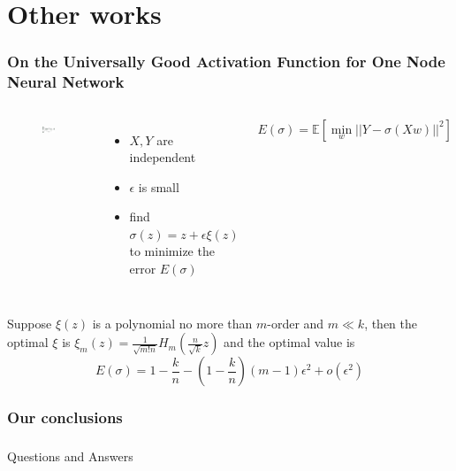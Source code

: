 \documentclass[notheorems]{beamer}
\begin{document}
\section{Other works}
\begin{frame}
	\frametitle{\small On the Universally Good Activation Function for One Node Neural Network}
	\begin{columns}
	\column{5cm}
	\begin{figure}
	\includegraphics[width=\textwidth]{./network_structure.eps}
	\end{figure}
	\column{5cm}
	\begin{itemize}
		\item $X,Y$ are independent
		\item  $\epsilon$ is small
		\item find $\sigma(z) = z + \epsilon \xi(z)$ to minimize the error $E(\sigma)$
	\end{itemize}
	$$
	E(\sigma)= \mathbb{E}[\min_{w} || Y - \sigma(X w) ||^2]
	$$
	\end{columns}
	\begin{theorem}
		Suppose $\xi(z)$ is a polynomial no more than $m$-order and $m\ll k$, then the optimal $\xi$ is $\xi_m(z) = \frac{1}{\sqrt{m! n}}H_m(\frac{n}{\sqrt{k}} z)$ and the optimal value is
		$$
		E(\sigma) = 1-\frac{k}{n}  - (1-\frac{k}{n})(m-1)  \epsilon^2 + o(\epsilon^2)
		$$
		\end{theorem}
\end{frame}

\begin{frame}
	\frametitle{Our conclusions}

\end{frame}

\begin{frame}
	\frametitle{}
	\begin{block}{}
	\centering
	{\Huge Questions and Answers}
	\end{block}
\end{frame}
\end{document}
